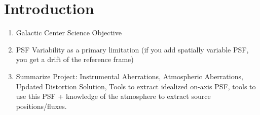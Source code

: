 \section{Introduction}

\begin{enumerate}
\item Galactic Center Science Objective
\item PSF Variability as a primary limitation (if you add spatially variable PSF, you get a drift of the reference frame)
\item Summarize Project: Instrumental Aberrations, Atmospheric Aberrations, Updated Distortion Solution, Tools to extract idealized on-axis PSF, tools to use this PSF + knowledge of the atmosphere to extract source positions/fluxes.
\end{enumerate}


